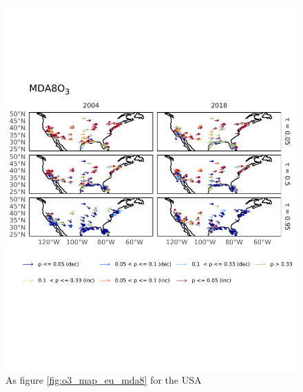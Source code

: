 \documentclass[journal abbreviation, manuscript]{copernicus}
\begin{document}
\begin{figure}[h!]
\centering
\includegraphics[height=0.9\textheight]{figures/paper_figures/o3_map/o3_map_piecewise_stats_freeTau_mda8_anom_all_us_o3.pdf}
\caption{As figure \ref{fig:o3_map_eu_mda8} for the USA}
\label{fig:o3_map_us_mda8}
\end{figure}
\end{document}
